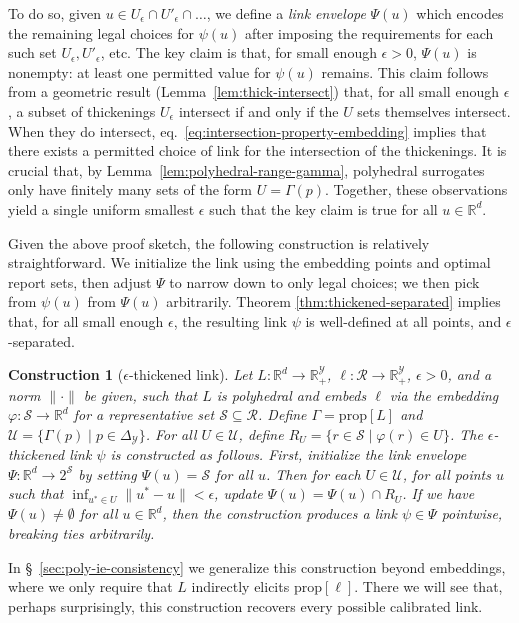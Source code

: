 \documentclass[twoside,11pt]{article}
\newcommand{\reals}{\mathbb{R}}
\newcommand{\prop}[1]{\mathrm{prop}[#1]}
\newcommand{\simplex}{\Delta_\Y}
\newcommand{\R}{\mathcal{R}}
\newcommand{\Sc}{\mathcal{S}}
\newcommand{\U}{\mathcal{U}}
\newcommand{\Y}{\mathcal{Y}}
\newtheorem{construction}{Construction}
\begin{document}
To do so, given $u \in U_\epsilon \cap U'_\epsilon \cap \dots$, we define a \emph{link envelope} $\Psi(u)$ which encodes the remaining legal choices for $\psi(u)$ after imposing the requirements for each such set $U_\epsilon,U'_\epsilon$, etc.
The key claim is that, for small enough $\epsilon > 0$, $\Psi(u)$ is nonempty: at least one permitted value for $\psi(u)$ remains.
This claim follows from a geometric result (Lemma~\ref{lem:thick-intersect}) that, for all small enough $\epsilon$, a subset of thickenings $U_{\epsilon}$ intersect if and only if the $U$ sets themselves intersect.
When they do intersect, eq.~\eqref{eq:intersection-property-embedding} implies that there exists a permitted choice of link for the intersection of the thickenings.
It is crucial that, by Lemma~\ref{lem:polyhedral-range-gamma}, polyhedral surrogates only have finitely many sets of the form $U = \Gamma(p)$.
Together, these observations yield a single uniform smallest $\epsilon$ such that the key claim is true for all $u \in \reals^d$.

Given the above proof sketch, the following construction is relatively straightforward.
We initialize the link using the embedding points and optimal report sets, then adjust $\Psi$ to narrow down to only legal choices; we then pick from $\psi(u)$ from $\Psi(u)$ arbitrarily.
Theorem \ref{thm:thickened-separated} implies that, for all small enough $\epsilon$, the resulting link $\psi$ is well-defined at all points, and $\epsilon$-separated.
\begin{construction}[$\epsilon$-thickened link] \label{const:eps-thick-link}
  Let $L:\reals^d\to\reals^\Y_+$, $\ell:\R\to\reals^\Y_+$, $\epsilon > 0$, and a norm $\|\cdot\|$ be given, such that $L$ is polyhedral and embeds $\ell$ via the embedding $\varphi: \Sc \to \reals^d$ for a representative set $\Sc\subseteq\R$.
  Define $\Gamma = \prop L$ and $\U = \{\Gamma(p) \mid p \in \simplex\}$.
  For all $U \in \U$, define $R_U = \{r \in \Sc \mid \varphi(r) \in U\}$.
  The \emph{$\epsilon$-thickened link} $\psi$ is constructed as follows.
  First, initialize the \emph{link envelope} $\Psi: \reals^d \to 2^{\Sc}$ by setting $\Psi(u) = \Sc$ for all $u$.
  Then for each $U \in \U$, for all points $u$ such that $\inf_{u^* \in U} \|u^*-u\| < \epsilon$, update $\Psi(u) = \Psi(u) \cap R_U$.
  If we have $\Psi(u)\neq\emptyset$ for all $u\in\reals^d$, then the construction \emph{produces a link} $\psi \in \Psi$ pointwise, breaking ties arbitrarily.
\end{construction}
In \S~\ref{sec:poly-ie-consistency} we generalize this construction beyond embeddings, where we only require that $L$ indirectly elicits $\prop\ell$.
There we will see that, perhaps surprisingly, this construction recovers every possible calibrated link.
\end{document}

